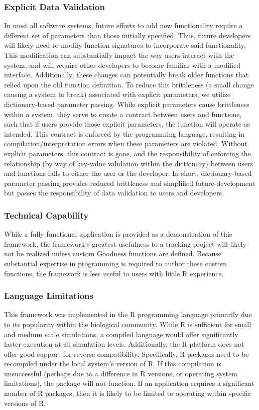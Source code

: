 \subsubsection{Explicit Data Validation}
In most all software systems, future efforts to add new functionality require a different set of parameters than those initially specified.  Thus, future developers will likely need to modify function signatures to incorporate said functionality.  This modification can substantially impact the way users interact with the system, and will require other developers to become familiar with a modified interface.  Additionally, these changes can potentially break older functions that relied upon the old function definition.  To reduce this brittleness (a small change causing a system to break) associated with explicit parameters, we utilize dictionary-based parameter passing.  While explicit parameters cause brittleness within a system, they serve to create a contract between users and functions, such that if users provide those explicit parameters, the function will operate as intended.  This contract is enforced by the programming language, resulting in compilation/interpretation errors when these parameters are violated.  Without explicit parameters, this contract is gone, and the responsibility of enforcing the relationship (by way of key-value validation within the dictionary) between users and functions falls to either the user or the developer.  In short, dictionary-based parameter passing provides reduced brittleness and simplified future-development but passes the responsibility of data validation to users and developers.

\subsubsection{Technical Capability}
While a fully functional application is provided as a demonstration of this framework, the framework's greatest usefulness to a tracking project will likely not be realized unless custom Goodness functions are defined.  Because substantial expertise in programming is required to author these custom functions, the framework is less useful to users with little R experience.  

\subsubsection{Language Limitations}
This framework was implemented in the R programming language primarily due to its popularity within the biological community.  While R is sufficient for small and medium scale simulations, a compiled language would offer significantly faster execution at all simulation levels.  Additionally, the R platform does not offer good support for reverse compatibility.  Specifically, R packages need to be recompiled under the local system's version of R.  If this compilation is unsuccessful (perhaps due to a difference in R versions, or operating system limitations), the package will not function.  If an application requires a significant number of R packages, then it is likely to be limited to operating within specific versions of R.

